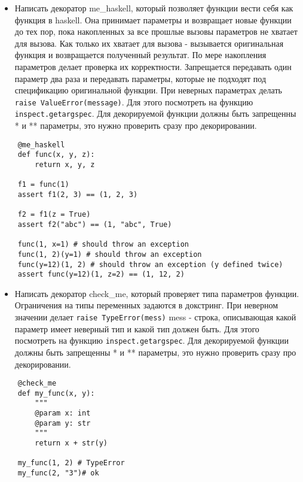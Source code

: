 \documentclass{article}
\begin{document}
\begin{itemize}
	\item Написать декоратор me\_haskell, который позволяет функции вести себя как функция в haskell.
		Она принимает параметры и возвращает новые функции до тех пор, пока накопленных
		за все прошлые вызовы параметров не хватает для вызова. Как только их хватает для 
		вызова - вызывается оригинальная функция и возвращается полученный результат.
		По мере накопления параметров делает проверка их корректности. 
		Запрещается передавать один параметр два раза и передавать параметры, которые не 
		подходят под спецификацию оригинальной функции. При неверных параметрах
		делать \lstinline!raise ValueError(message)!. 
		Для этого посмотреть на функцию \lstinline!inspect.getargspec!.
		Для декорируемой функции должны быть запрещенны * и ** параметры, это
		нужно проверить сразу про декорировании.
\end{itemize}
\vspace{15pt}
\begin{lstlisting}
	@me_haskell
	def func(x, y, z):
		return x, y, z

	f1 = func(1)
	assert f1(2, 3) == (1, 2, 3)
	
	f2 = f1(z = True)
	assert f2("abc") == (1, "abc", True)

	func(1, x=1) # should throw an exception
	func(1, 2)(y=1) # should throw an exception
	func(y=12)(1, 2) # should throw an exception (y defined twice)
	assert func(y=12)(1, z=2) == (1, 12, 2)
\end{lstlisting}
\newpage

\begin{itemize}
	\item Написать декоратор check\_me, который проверяет типа параметров функции.
		Ограничения на типы переменных задаются в докстринг. При неверном
		значении делает \lstinline!raise TypeError(mess)! mess - строка,
		описывающая какой параметр имеет неверный тип и какой тип должен быть.
		Для этого посмотреть на функцию \lstinline!inspect.getargspec!.
		Для декорируемой функции должны быть запрещенны * и ** параметры, это
		нужно проверить сразу про декорировании.
\end{itemize}

\vspace{15pt}
\begin{lstlisting}
	@check_me
	def my_func(x, y):
		"""
		@param x: int
		@param y: str
		"""
		return x + str(y)

	my_func(1, 2) # TypeError
	my_func(2, "3")# ok
\end{lstlisting}
\newpage

\end{document}
